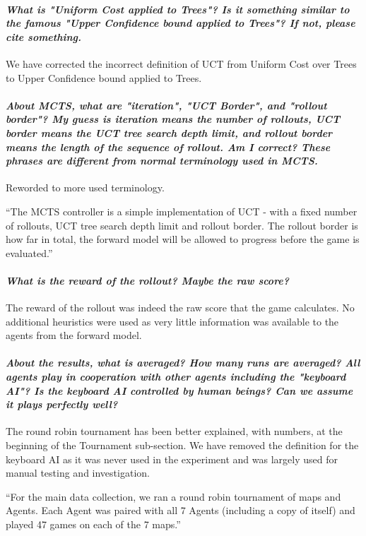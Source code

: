 \documentclass{article}
\begin{document}
\paragraph*{\textit{What is "Uniform Cost applied to Trees"? Is it something similar to the famous "Upper Confidence bound applied to Trees"? If not, please cite something.}}
We have corrected the incorrect definition of UCT from Uniform Cost over Trees to Upper Confidence bound applied to Trees.
\paragraph*{\textit{About MCTS, what are "iteration", "UCT Border", and "rollout border"? My guess is iteration means the number of rollouts,
UCT border means the UCT tree search depth limit, and rollout border means the length of the sequence of rollout. Am I correct? These phrases are different from normal terminology used in MCTS.}}
Reworded to more used terminology.

``The MCTS controller is a simple implementation of UCT - with a fixed number of rollouts, UCT tree search depth limit and rollout border. The rollout border is how far in total, the forward model will be allowed to progress before the game is evaluated.''
\paragraph*{\textit{What is the reward of the rollout? Maybe the raw score?}}
The reward of the rollout was indeed the raw score that the game calculates. No additional heuristics were used as very little information was available to the agents from the forward model.
\paragraph*{\textit{About the results, what is averaged? How many runs are averaged? All agents play in cooperation with other agents including the "keyboard AI"? Is the keyboard AI controlled by human beings? Can we assume it plays perfectly well?}}
The round robin tournament has been better explained, with numbers, at the beginning of the Tournament sub-section.
We have removed the definition for the keyboard AI as it was never used in the experiment and was largely used for manual testing and investigation.

``For the main data collection, we ran a round robin tournament of maps and Agents. Each Agent was paired with all 7 Agents (including a copy of itself) and played 47 games on each of the 7 maps.''
\end{document}
